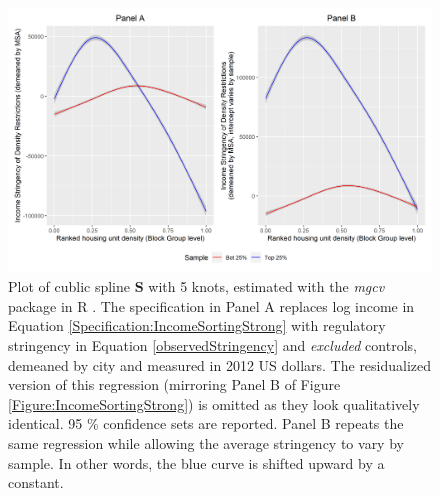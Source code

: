 \documentclass[]{article}
\begin{document}
	\begin{figure}[!ht]
		\begin{center}
			\includegraphics[width=\textwidth]{incomestringency_combined.png}
			\caption{Plot of cublic spline $\mathbf{S}$ with 5 knots, estimated with the \textit{mgcv} package in R \citep{gampackage}. The specification in Panel A replaces log income in Equation \eqref{Specification:IncomeSortingStrong} with regulatory stringency in Equation \eqref{observedStringency} and \textit{excluded} controls, demeaned by city and measured in 2012 US dollars. The residualized version of this regression (mirroring Panel B of Figure \ref{Figure:IncomeSortingStrong}) is omitted as they look qualitatively identical. 95 \% confidence sets are reported. Panel B repeats the same regression while allowing the average stringency to vary by sample. In other words, the blue curve is shifted upward by a constant. }\label{Figure:StringencyStrong} 
		\end{center}
	\end{figure}
\end{document}
